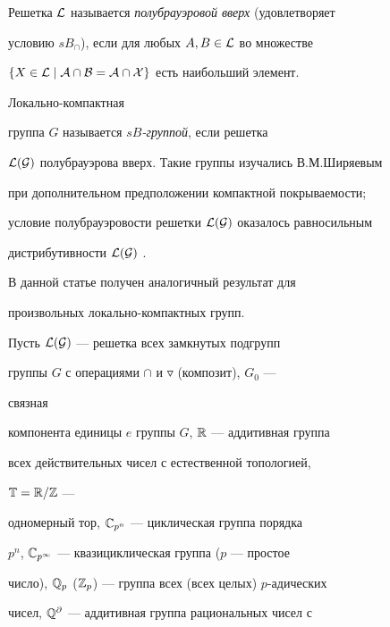  




\maketitle 


\label{begin}  


 


Решетка $\cal L$ называется {\it полубрауэровой вверх} (удовлетворяет 


условию $sB_\cap$), если для любых $A,B\in\cal L$ во множестве 


$\{X\in\cal L\mid A\cap B=A\cap X\}$ есть наибольший элемент. 


Локально-компактная 


группа $G$ называется {\it $sB$-группой}, если решетка 


$\cal L(G)$ полубрауэрова вверх. Такие группы изучались В.М.Ширяевым 


при дополнительном предположении компактной покрываемости; 


условие полубрауэровости решетки $\cal L(G)$ оказалось равносильным 


дистрибутивности $\cal L(G)$ \cite{1}. 


В данной статье получен аналогичный результат для 


произвольных локально-компактных групп. 


 


Пусть $\cal L(G)$ --- решетка всех замкнутых подгрупп 


группы $G$ с операциями $\cap$ и $\triangledown$ (композит), $G_0$ --- 


связная  


компонента единицы $e$ группы $G$, $\Bbb R$ --- аддитивная группа  


всех действительных чисел с естественной топологией, 


$\Bbb T=\Bbb R/\Bbb Z$ --- 


одномерный тор, $\Bbb C_{p^n}$ --- циклическая группа порядка 


$p^n$, $\Bbb C_{p^\infty}$ --- квазициклическая группа ($p$ --- простое  


число), $\Bbb Q_p$ ($\Bbb Z_p$) --- группа всех (всех целых) $p$-адических 


чисел, $\Bbb Q^\partial$ --- аддитивная группа рациональных чисел с 


